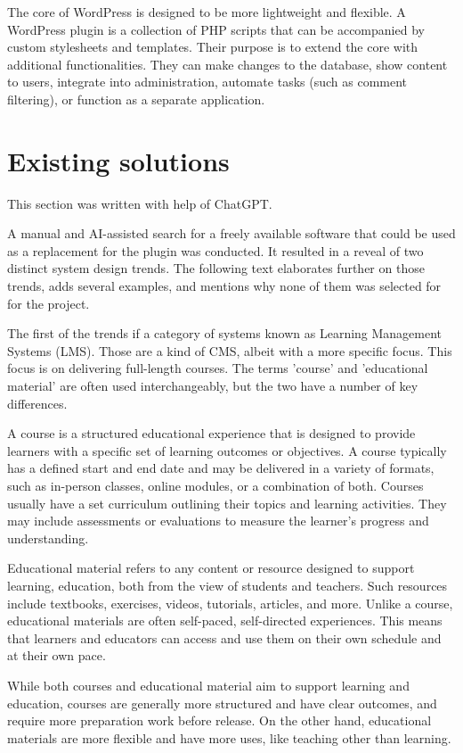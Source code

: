 \documentclass[
  digital,     %
  oneside,     %
  nosansbold,  %
  colorbold, %
  lof,         %
  lot,         %
]{fithesis4}
\begin{document}
The core of WordPress is designed to be more lightweight and flexible. A WordPress
plugin is a collection of PHP scripts that can be accompanied by custom stylesheets
and templates. Their purpose is to extend the core with additional functionalities.
They can make changes to the database, show content to users, integrate into
administration, automate tasks (such as comment filtering), or function as
a separate application.

\section{Existing solutions}

This section was written with help of ChatGPT.

A manual and AI-assisted search for a freely available software that could be used as a replacement
for the plugin was conducted. It resulted in a reveal of two distinct system design trends. The following
text elaborates further on those trends, adds several examples, and mentions why none of them was
selected for for the project.

The first of the trends if a category of systems known as Learning Management Systems (LMS). Those
are a kind of CMS, albeit with a more specific focus. This focus is on delivering full-length courses. The terms
'course' and 'educational material' are often used interchangeably, but the two have a number of key differences.

A course is a structured educational experience that is designed to provide learners with a specific set of
learning outcomes or objectives. A course typically has a defined start and end date and may be delivered
in a variety of formats, such as in-person classes, online modules, or a combination of both. Courses usually
have a set curriculum outlining their topics and learning activities. They may include assessments or evaluations
to measure the learner's progress and understanding.

Educational material refers to any content or resource designed to support learning, education, both from
the view of students and teachers. Such resources include textbooks, exercises, videos, tutorials, articles, and more.
Unlike a course, educational materials are often self-paced, self-directed experiences. This means that learners
and educators can access and use them on their own schedule and at their own pace.

While both courses and educational material aim to support learning and education, courses are generally
more structured and have clear outcomes, and require more preparation work before release. On the other
hand, educational materials are more flexible and have more uses, like teaching other than learning.
\end{document}
